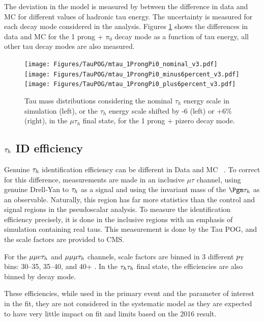 The deviation in the model is measured by between the difference in data and MC for different values of hadronic tau energy. The uncertainty is measured for each decay mode considered in the analysis. Figures \ref{fig:taues} shows the differences in data and MC for the 1 prong + $\pi_0$ decay mode as a function of tau energy, all other tau decay modes are also measured. 

\begin{figure}[h!]
    \begin{center}
        \texttt{[image: Figures/TauPOG/mtau\_1ProngPi0\_nominal\_v3.pdf]}
        \texttt{[image: Figures/TauPOG/mtau\_1ProngPi0\_minus6percent\_v3.pdf]}
        \texttt{[image: Figures/TauPOG/mtau\_1ProngPi0\_plus6percent\_v3.pdf]}
    \end{center}
    \caption{Tau mass distributions considering the nominal $\tau_h$ energy scale in simulation (left), or the $\tau_h$ energy scale shifted by -6 (left) or +6\% (right), in the $\mu\tau_h$ final state, for the 1 prong + pizero decay mode.}
    \label{fig:taues}
\end{figure}

\subsection{$\tau_h$ ID efficiency}

Genuine $\tau_h$ identification efficiency can be different in Data and MC ~\cite{TAUIDTwiki}. To correct for this difference, measurements are 
made in an inclusive $\mu\tau$ channel, using genuine Drell-Yan to $\tau_h$ as a signal and using the invariant mass
of the $\Pgm\tauh$ as an observable. Naturally, this region has far more statistics than the control and signal regions in the pseudoscalar analysis. To measure the identification efficiency precisely, it is done in the inclusive regions with an emphasis of simulation containing real taus. This measurement is done by the Tau POG, and the scale factors are provided to CMS. 

For the $\mu\mu e \tau_h$ and $\mu\mu\mu\tau_h$ channels, scale factors are binned in 3 different $p_{\mathrm{T}}$ bins: 30--35, 35--40, and 40+ \GeV. In the $\tau_h\tau_h$ final state, the efficiencies are also binned by decay mode. 


These efficiencies, while used in the primary event and the parameter of interest in the fit, they are not considered in the systematic model as they are expected to have very little impact on fit and limits based on the 2016 result. 


